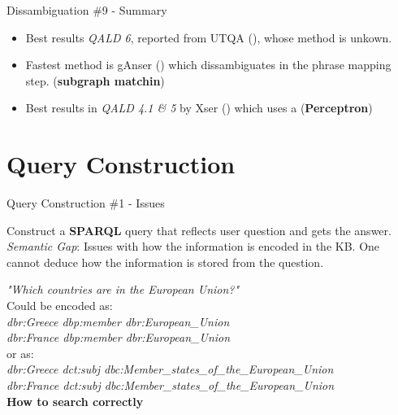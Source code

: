 \documentclass{beamer}
\begin{document}
\begin{frame}{Dissambiguation \#9 - Summary}
  \begin{card}
    \begin{itemize}
      \item Best results \textit{QALD 6}, reported from UTQA (\cite{pouran2016a}), whose method is unkown.
      \item Fastest method is gAnser (\cite{zou2014a}) which dissambiguates in the phrase mapping step. (\textbf{subgraph matchin})
      \item Best results in \textit{QALD 4.1 \& 5} by Xser (\cite{zou2014a}) which uses a (\textbf{Perceptron})
    \end{itemize}
  \end{card}
\end{frame}

\note{}

\section{Query Construction}

\begin{frame}{Query Construction \#1 - Issues}
  \begin{cardTiny}
    Construct a \textbf{SPARQL} query that reflects user question and gets the answer. \\
    \textit{Semantic Gap}: Issues with how the information is encoded in the KB\@. One cannot deduce how the information is stored from the question.
  \end{cardTiny}
  \begin{cardTiny}
    \textit{"Which countries are in the European Union?"} \\
    Could be encoded as: \\
    \textit{dbr:Greece dbp:member dbr:European\_Union} \\
    \textit{dbr:France dbp:member dbr:European\_Union} \\
    or as: \\
    \textit{dbr:Greece dct:subj dbc:Member\_states\_of\_the\_European\_Union} \\
    \textit{dbr:France dct:subj dbc:Member\_states\_of\_the\_European\_Union} \\
    \textbf{How to search correctly}
  \end{cardTiny}
\end{frame}

\note{}
\end{document}
